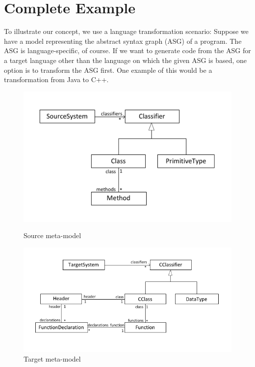 \chapter{Complete Example}

To illustrate our concept, we use a language transformation scenario: Suppose we have a model representing the abstract syntax graph (ASG) of a program. The ASG is language-specific, of course. If we want to generate code from the ASG for a target language other than the language on which the given ASG is based, one option is to transform the ASG first.
One example of this would be a transformation from Java to C++.

\begin{figure}[ht]

\begin{minipage}[b]{0.42\linewidth}
	\centering
	\includegraphics[scale=0.7]{figures/sourceMetamodel}
\caption{Source meta-model}
\label{fig:sourceMetamodel}
\end{minipage}
\hfill
\begin{minipage}[b]{0.55\linewidth}
\centering
	\includegraphics[scale=0.7]{figures/targetMetamodel}
\caption{Target meta-model}
\label{fig:targetMetamodel}
\end{minipage}

\end{figure}


